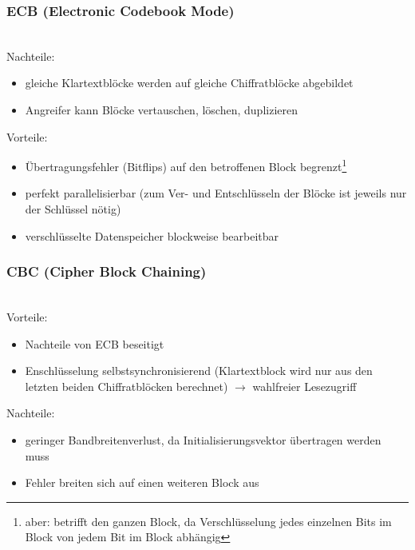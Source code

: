 \documentclass[a4paper,twoside,DIV15,BCOR12mm]{scrbook}
\begin{document}
\subsubsection{ECB (Electronic Codebook Mode)}

\\

Nachteile:

\begin{itemize}
	\item gleiche Klartextblöcke werden auf gleiche Chiffratblöcke abgebildet
	\item Angreifer kann Blöcke vertauschen, löschen, duplizieren
\end{itemize}

Vorteile:

\begin{itemize}
	\item Übertragungsfehler (Bitflips) auf den betroffenen Block begrenzt\footnote{aber: betrifft den ganzen Block, da Verschlüsselung jedes einzelnen Bits im Block von jedem Bit im Block abhängig}
	\item perfekt parallelisierbar (zum Ver- und Entschlüsseln der Blöcke ist jeweils nur der Schlüssel nötig)
	\item verschlüsselte Datenspeicher blockweise bearbeitbar
\end{itemize}

\subsubsection{CBC (Cipher Block Chaining)}

\\

Vorteile:

\begin{itemize}
	\item Nachteile von ECB beseitigt
	\item Enschlüsselung selbstsynchronisierend (Klartextblock wird nur aus den letzten beiden Chiffratblöcken berechnet) $\rightarrow$ wahlfreier Lesezugriff
\end{itemize}

Nachteile:

\begin{itemize}
	\item geringer Bandbreitenverlust, da Initialisierungsvektor übertragen werden muss
	\item Fehler breiten sich auf einen weiteren Block aus
\end{itemize}
\end{document}
